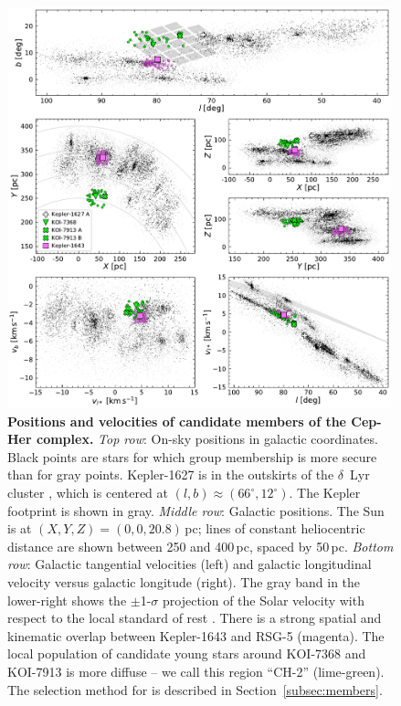 \documentclass[12pt,twocolumn,tighten,linenumbers,trackchanges]{aastex63}
\begin{document}
\begin{figure}[t]
	\begin{center}
		\leavevmode
		\includegraphics[width=0.99\textwidth]{f1.pdf}
	\end{center}
	\vspace{-0.6cm}
	\caption{
  {\bf Positions and velocities of candidate members of the Cep-Her
  complex.}
  {\it Top row}: On-sky positions in galactic coordinates.  Black
  points are stars for which group membership is more secure than for
  gray points.  Kepler-1627 is in the outskirts of the $\delta$\ Lyr
  cluster \citep{bouma_kep1627_2022}, which is centered at $(l,b)
  \approx (66^\circ, 12^\circ)$.
  The Kepler footprint is shown in gray.
  {\it Middle row}: Galactic positions.  The Sun is at $(X, Y, Z) =
  (0, 0, 20.8)$\,pc; lines of constant heliocentric distance are
  shown between 250 and 400\,pc, spaced by 50\,pc.
  {\it Bottom row}: Galactic tangential velocities (left) and
  galactic longitudinal velocity versus galactic longitude (right).
  The gray band in the lower-right shows the $\pm$1-$\sigma$
  projection of the Solar velocity with respect to the local standard
  of rest \citep{schonrich_local_2010}.  There is a strong spatial and kinematic overlap between
  Kepler-1643 and RSG-5 (magenta).  The local population
  of candidate young stars around KOI-7368 and KOI-7913 is more
  diffuse -- we call this region ``CH-2'' (lime-green).
  The selection method for 
  is described in Section~\ref{subsec:members}.
	\label{fig:XYZvtang}
	}
\end{figure}
\end{document}
